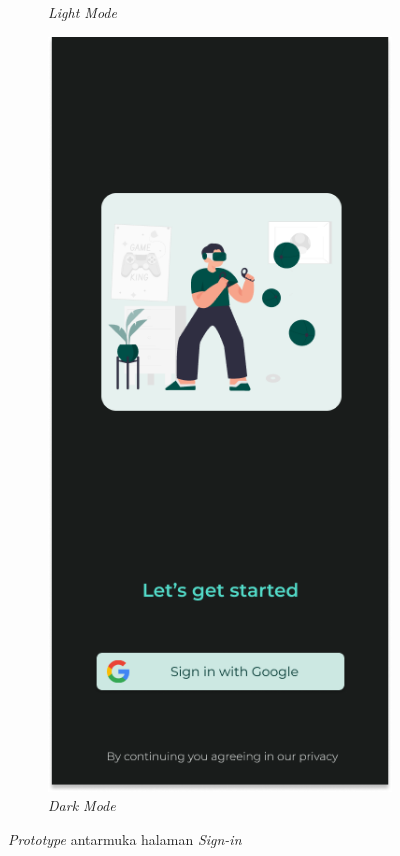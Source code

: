 \begin{figure}[H]
\begin{subfigure}[b]{0.25\textwidth}
	  \caption{\textit{Light Mode}}
	  \label{fig:HasilLogin}
	\end{subfigure}
	\begin{subfigure}[b]{0.25\textwidth}
		\centering
	  \includegraphics[width=\linewidth]{contents/chapter-3/images/HF-login-dt.png}
	  \caption{\textit{Dark Mode}}
	  \label{fig:HasilLogin2}
	\end{subfigure}
	\caption{\textit{Prototype} antarmuka halaman \textit{Sign-in}}
	\label{Fig:HasilFeatureSetLogin}
\end{figure}

